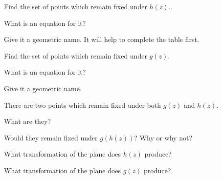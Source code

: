 \documentclass[../gatm_answers.tex]{subfiles}
\begin{document}
\begin{outer_problem}
\item Find the set of points which remain fixed under $h(z)$.
\end{outer_problem}

\begin{inner_problem}[start=1]
\item What is an equation for it?
\end{inner_problem}

\begin{inner_problem}
\item Give it a geometric name. It will help to complete the table first.
\end{inner_problem}

\begin{outer_problem}
\item Find the set of points which remain fixed under $g(z)$.
\end{outer_problem}

\begin{inner_problem}[start=1]
\item What is an equation for it?
\end{inner_problem}

\begin{inner_problem}
\item Give it a geometric name.
\end{inner_problem}

\begin{outer_problem}
\item There are two points which remain fixed under both $g(z)$ and $h(z)$.
\end{outer_problem}

\begin{inner_problem}[start=1]
\item What are they?
\end{inner_problem}

\begin{inner_problem}
\item Would they remain fixed under $g(h(z))$? Why or why not?
\end{inner_problem}

\begin{outer_problem}
\item What transformation of the plane does $h(z)$ produce?
\end{outer_problem}

\begin{outer_problem}
\item What transformation of the plane does $g(z)$ produce?
\end{outer_problem}
\end{document}
